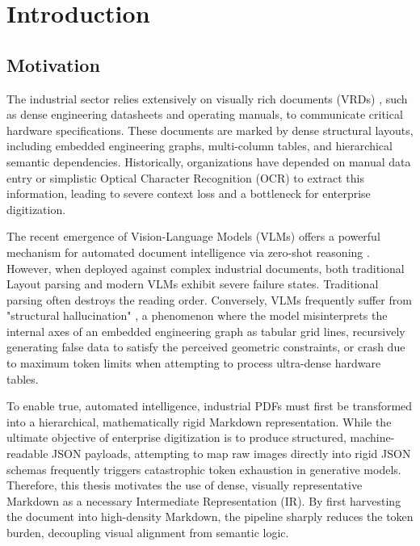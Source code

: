 \chapter{Introduction}
\label{ch:introduction}

\section{Motivation}
\label{sec:motivation}

The industrial sector relies extensively on visually rich documents (VRDs) \citep{docai_survey}, such as dense engineering datasheets and operating manuals, to communicate critical hardware specifications. These documents are marked by dense structural layouts, including embedded engineering graphs, multi-column tables, and hierarchical semantic dependencies. Historically, organizations have depended on manual data entry or simplistic Optical Character Recognition (OCR) to extract this information, leading to severe context loss and a bottleneck for enterprise digitization.

The recent emergence of Vision-Language Models (VLMs) offers a powerful mechanism for automated document intelligence via zero-shot reasoning \citep{gpt4v, qwen_vl}. However, when deployed against complex industrial documents, both traditional Layout parsing and modern VLMs exhibit severe failure states. Traditional parsing often destroys the reading order. Conversely, VLMs frequently suffer from "structural hallucination" \citep{docvqa}, a phenomenon where the model misinterprets the internal axes of an embedded engineering graph as tabular grid lines, recursively generating false data to satisfy the perceived geometric constraints, or crash due to maximum token limits when attempting to process ultra-dense hardware tables.

To enable true, automated intelligence, industrial PDFs must first be transformed into a hierarchical, mathematically rigid Markdown representation. While the ultimate objective of enterprise digitization is to produce structured, machine-readable JSON payloads, attempting to map raw images directly into rigid JSON schemas frequently triggers catastrophic token exhaustion in generative models. Therefore, this thesis motivates the use of dense, visually representative Markdown as a necessary Intermediate Representation (IR). By first harvesting the document into high-density Markdown, the pipeline sharply reduces the token burden, decoupling visual alignment from semantic logic.

